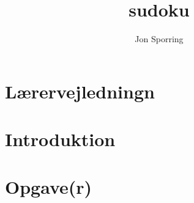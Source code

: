 \documentclass[a4paper,12pt]{article}
\title{sudoku}
\author{Jon Sporring}
\begin{document}
\maketitle

\section{Lærervejledningn}

\section{Introduktion}

\section{Opgave(r)}

\end{document}
